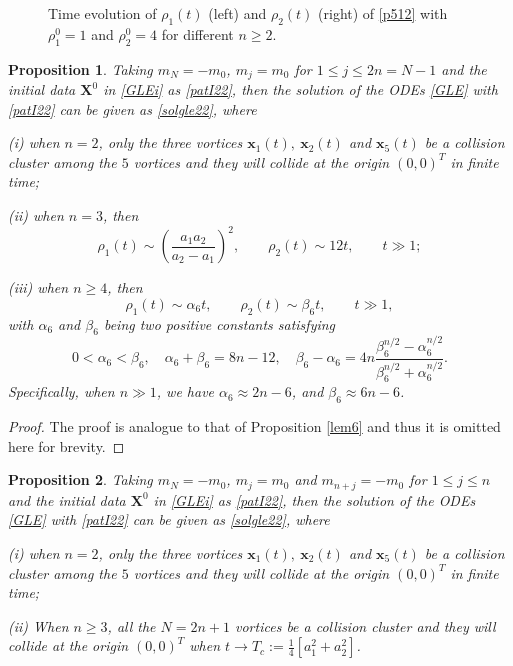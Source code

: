 \documentclass{aims}
\theoremstyle{plain}
\newtheorem{proposition}{Proposition}[section]
\theoremstyle{definition}
\newcommand{\bX}{{\mathbf X}}
\newcommand{\be} {\begin{equation}}
\newcommand{\ee}{\end{equation}}
\begin{document}
\begin{figure}[t!]
\centerline{
}
\caption{Time evolution of $\rho_1(t)$ (left) and $\rho_2(t)$ (right)
of \eqref{p512} with $\rho_1^0=1$ and $\rho_2^0=4$ for different $n\ge2$.}
\label{rho123}
\end{figure}



\begin{proposition}\label{lem9}
Taking $m_N=-m_0$, $m_j=m_0$  for $1\le j\le 2n=N-1$ and
the initial data $\bX^0$ in \eqref{GLEi} as
\eqref{patI22}, then the solution of the ODEs
\eqref{GLE} with \eqref{patI22} can be given as
 \eqref{solgle22},
where

(i) when $n=2$, only the three vortices $\mathbf x_1(t),\ \mathbf x_2(t)$ and $\mathbf x_5(t)$  be a collision cluster among the $5$ vortices and they will
collide at the origin $(0,0)^T$ in finite time;


(ii) when $n=3$, then \be
\rho_1(t)\sim\left(\frac{a_1a_2}{a_2-a_1}\right)^2,
\qquad \rho_2(t)\sim 12t, \qquad t\gg1; \nonumber
\ee

(iii) when $n\geq 4$, then
\be
\rho_1(t)\sim \alpha_6 t,\qquad
\rho_2(t)\sim \beta_6 t, \qquad t\gg 1, \nonumber
\ee
with $\alpha_6$ and $\beta_6$ being two positive constants satisfying
\be
0<\alpha_6<\beta_6, \quad \alpha_6+\beta_6=8n-12,\quad
\beta_6-\alpha_6=4n\frac{\beta_6^{n/2}-\alpha_6^{n/2}}
{\beta_6^{n/2}+\alpha_6^{n/2}}. \nonumber
\ee
Specifically, when $n\gg1$, we have $\alpha_6\approx 2n-6$, and $\beta_6\approx 6n-6$.

\end{proposition}

\begin{proof} The proof is analogue to that of Proposition
\ref{lem6} and thus it is
omitted here for brevity.
\end{proof}


\begin{proposition}\label{lem2}
Taking $m_N=-m_0$, $m_j=m_0$ and $m_{n+j}=-m_0$ for $1\le j\le n$ and
the initial data $\bX^0$ in \eqref{GLEi} as
\eqref{patI22}, then the solution of the ODEs
\eqref{GLE} with \eqref{patI22} can be given as
 \eqref{solgle22},
where

(i) when $n=2$, only the three vortices $\mathbf x_1(t),\ \mathbf x_2(t)$ and $\mathbf x_5(t)$  be a collision cluster among the $5$ vortices and they will
collide at the origin $(0,0)^T$ in finite time;

(ii) When $n\geq 3$, all the $N=2n+1$ vortices be a collision cluster and they will collide at the origin $(0,0)^T$ when $t\to T_c:=\frac{1}{4}[a_1^2+a_2^2]$.
\end{proposition}
\end{document}
